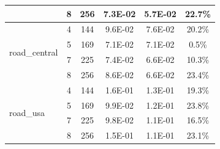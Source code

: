 \documentclass[conference, 10ppt]{IEEEtran}
\begin{document}
\begin{table}[htb]
\begin{tabular}[c]{| l | c | c | c | c | c |}
  &  8  &  256  &  7.3E-02  &  5.7E-02  &  22.7\% \\ \hline
\multirow{4}{*}{road\_central} &  4  &  144  &  9.6E-02  &  7.6E-02  &  20.2\% \\ \cline{2-6}
\  &  5  &  169  &  7.1E-02  &  7.1E-02  &  0.5\% \\ \cline{2-6}
  &  7  &  225  &  7.4E-02  &  6.6E-02  &  10.3\% \\ \cline{2-6}
  &  8  &  256  &  8.6E-02  &  6.6E-02  &  23.4\% \\ \hline
\multirow{4}{*}{road\_usa}   &  4  &  144  &  1.6E-01  &  1.3E-01  &  19.3\% \\ \cline{2-6}
  &  5  &  169  &  9.9E-02  &  1.2E-01  &  23.8\% \\ \cline{2-6}
  &  7  &  225  &  9.8E-02  &  1.1E-01  &  16.5\% \\ \cline{2-6}
  &  8  &  256  &  1.5E-01  &  1.1E-01  &  23.1\% \\ \hline
\end{tabular}
\end{table}
\end{document}
